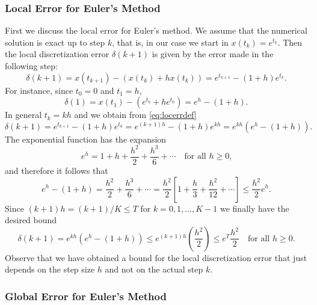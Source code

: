 \documentclass{ximera}
\begin{document}
\subsubsection*{Local Error for Euler's Method}

First we discuss the local error for Euler's method.  
We assume that the
numerical solution is exact up to step $k$, that is, in our case
we start in $x(t_k)=e^{t_k}$.  Then the local discretization error 
$\delta(k+1)$ is given by the error made in the following step:
\begin{equation}
\label{eq:locerrdef}
\delta(k+1) = x(t_{k+1}) - (x(t_k) + h x(t_k))=
e^{t_{k+1}} - (1+h)e^{t_k}.
\end{equation}
For instance, since $t_0=0$ and $t_1=h$,
\[
\delta(1) = x(t_1) - (e^{t_0} + h e^{t_0}) = e^h-(1+h).
\]
In general $t_k = kh$ and we obtain from \eqref{eq:locerrdef}
\[
\delta(k+1) = e^{t_{k+1}} - (1+h)e^{t_k} = 
e^{(k+1)h} - (1+h)e^{kh} = e^{kh}(e^h-(1+h)).
\]
The exponential function has the expansion
\begin{equation}
\label{eq:ehgeh}
e^h=1+h+\frac{h^2}{2}+\frac{h^3}{6}+\cdots
\quad \mbox{for all $h\ge 0$,}
\end{equation}
and therefore it follows that
\[
e^h-(1+h) = \frac{h^2}{2}+\frac{h^3}{6}+\cdots =
\frac{h^2}{2}\left[ 1+\frac{h}{3}+\frac{h^2}{12}+\cdots\right]
\le \frac{h^2}{2}e^h.
\]
Since $(k+1)h=(k+1)/K\le T$ for $k=0,1,\ldots,K-1$ we finally have the 
desired bound
\begin{equation}
\label{eq:locerr}
\delta(k+1) = e^{kh}(e^h-(1+h)) \le e^{(k+1)h}\left(\frac{h^2}{2}\right)\le
e^T\frac{h^2}{2} \quad \mbox{for all $h\ge 0$.}
\end{equation}
Observe that we have obtained a bound for the local discretization
error that just 
depends on the step size $h$ and not on the actual 
step $k$.

\subsubsection*{Global Error for Euler's Method}
\end{document}
